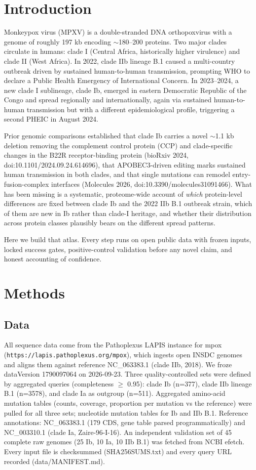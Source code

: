 \documentclass[11pt]{article}
\begin{document}
\section{Introduction}
Monkeypox virus (MPXV) is a double-stranded DNA orthopoxvirus with a genome of roughly 197 kb
encoding $\sim$180--200 proteins. Two major clades circulate in humans: clade I (Central Africa,
historically higher virulence) and clade II (West Africa). In 2022, clade IIb lineage B.1 caused a
multi-country outbreak driven by sustained human-to-human transmission, prompting WHO to declare a
Public Health Emergency of International Concern. In 2023--2024, a new clade I sublineage, clade Ib,
emerged in eastern Democratic Republic of the Congo and spread regionally and internationally,
again via sustained human-to-human transmission but with a different epidemiological profile,
triggering a second PHEIC in August 2024.

Prior genomic comparisons established that clade Ib carries a novel $\sim$1.1 kb deletion removing
the complement control protein (CCP) and clade-specific changes in the B22R receptor-binding protein
(bioRxiv 2024, doi:10.1101/2024.09.24.614696), that APOBEC3-driven editing marks sustained human
transmission in both clades, and that single mutations can remodel entry-fusion-complex interfaces
(Molecules 2026, doi:10.3390/molecules31091466). What has been missing is a systematic,
proteome-wide account of \emph{which} protein-level differences are fixed between clade Ib and the
2022 IIb B.1 outbreak strain, which of them are new in Ib rather than clade-I heritage, and whether
their distribution across protein classes plausibly bears on the different spread patterns.

Here we build that atlas. Every step runs on open public data with frozen inputs, locked success
gates, positive-control validation before any novel claim, and honest accounting of confidence.

\section{Methods}
\subsection{Data}
All sequence data come from the Pathoplexus LAPIS instance for mpox
(\texttt{https://lapis.pathoplexus.org/mpox}), which ingests open INSDC genomes and aligns them against
reference NC\_063383.1 (clade IIb, 2018). We froze dataVersion 1790097064 on 2026-09-23. Three
quality-controlled sets were defined by aggregated queries (completeness $\geq$ 0.95): clade Ib
(n=377), clade IIb lineage B.1 (n=3578), and clade Ia as outgroup (n=511). Aggregated amino-acid
mutation tables (counts, coverage, proportion per mutation vs the reference) were pulled for all
three sets; nucleotide mutation tables for Ib and IIb B.1. Reference annotations: NC\_063383.1
(179 CDS, gene table parsed programmatically) and NC\_003310.1 (clade Ia, Zaire-96-I-16). An
independent validation set of 45 complete raw genomes (25 Ib, 10 Ia, 10 IIb B.1) was fetched from
NCBI efetch. Every input file is checksummed (SHA256SUMS.txt) and every query URL recorded
(data/MANIFEST.md).
\end{document}
